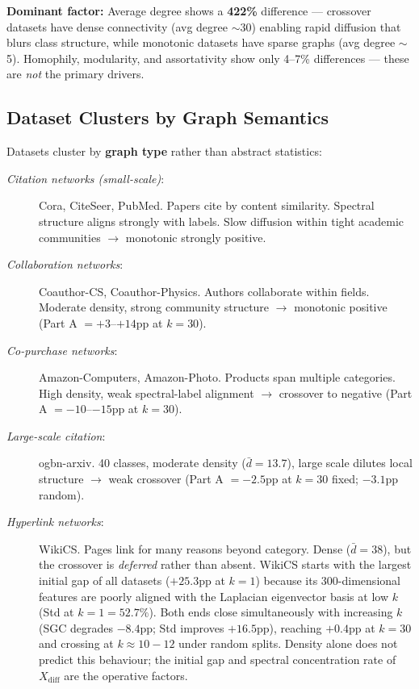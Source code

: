 \documentclass[11pt]{article}
\begin{document}
\noindent\textbf{Dominant factor:} Average degree shows a \textbf{422\%} difference ---
crossover datasets have dense connectivity (avg degree $\sim$30) enabling rapid diffusion
that blurs class structure, while monotonic datasets have sparse graphs (avg degree $\sim$5).
Homophily, modularity, and assortativity show only 4--7\% differences --- these are
\emph{not} the primary drivers.

\subsection{Dataset Clusters by Graph Semantics}

Datasets cluster by \textbf{graph type} rather than abstract statistics:

\begin{description}
  \item[\textit{Citation networks (small-scale)}:] Cora, CiteSeer, PubMed.
    Papers cite by content similarity.  Spectral structure aligns strongly with labels.
    Slow diffusion within tight academic communities $\to$ monotonic strongly positive.
  \item[\textit{Collaboration networks}:] Coauthor-CS, Coauthor-Physics.
    Authors collaborate within fields.  Moderate density, strong community structure
    $\to$ monotonic positive (Part A $= +3$--$+14$pp at $k{=}30$).
  \item[\textit{Co-purchase networks}:] Amazon-Computers, Amazon-Photo.
    Products span multiple categories.  High density, weak spectral-label alignment
    $\to$ crossover to negative (Part A $= -10$--$-15$pp at $k{=}30$).
  \item[\textit{Large-scale citation}:] ogbn-arxiv.
    40 classes, moderate density ($\bar{d}{=}13.7$), large scale dilutes local structure
    $\to$ weak crossover (Part A $= -2.5$pp at $k{=}30$ fixed; $-3.1$pp random).
  \item[\textit{Hyperlink networks}:] WikiCS.
    Pages link for many reasons beyond category.  Dense ($\bar{d}{=}38$), but the
    crossover is \emph{deferred} rather than absent.  WikiCS starts with the largest
    initial gap of all datasets ($+25.3$pp at $k{=}1$) because its 300-dimensional
    features are poorly aligned with the Laplacian eigenvector basis at low $k$
    (Std at $k{=}1 = 52.7\%$).  Both ends close simultaneously with increasing $k$
    (SGC degrades $-8.4$pp; Std improves $+16.5$pp), reaching $+0.4$pp at $k{=}30$
    and crossing at $k{\approx}10{-}12$ under random splits.
    Density alone does not predict this behaviour; the initial gap and spectral
    concentration rate of $X_{\mathrm{diff}}$ are the operative factors.
\end{description}
\end{document}
